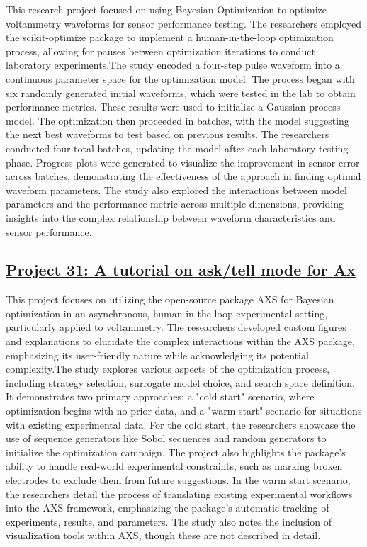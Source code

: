 This research project focused on using Bayesian Optimization to optimize voltammetry waveforms for sensor performance testing. The researchers employed the scikit-optimize package to implement a human-in-the-loop optimization process, allowing for pauses between optimization iterations to conduct laboratory experiments.The study encoded a four-step pulse waveform into a continuous parameter space for the optimization model. The process began with six randomly generated initial waveforms, which were tested in the lab to obtain performance metrics. These results were used to initialize a Gaussian process model. The optimization then proceeded in batches, with the model suggesting the next best waveforms to test based on previous results. The researchers conducted four total batches, updating the model after each laboratory testing phase. Progress plots were generated to visualize the improvement in sensor error across batches, demonstrating the effectiveness of the approach in finding optimal waveform parameters. The study also explored the interactions between model parameters and the performance metric across multiple dimensions, providing insights into the complex relationship between waveform characteristics and sensor performance.
 \subsection*{\href{https://www.youtube.com/watch?v=X5PDvdXoBdA}{Project 31: A tutorial on ask/tell mode for Ax}}

This project focuses on utilizing the open-source package AXS for Bayesian optimization in an asynchronous, human-in-the-loop experimental setting, particularly applied to voltammetry. The researchers developed custom figures and explanations to elucidate the complex interactions within the AXS package, emphasizing its user-friendly nature while acknowledging its potential complexity.The study explores various aspects of the optimization process, including strategy selection, surrogate model choice, and search space definition. It demonstrates two primary approaches: a "cold start" scenario, where optimization begins with no prior data, and a "warm start" scenario for situations with existing experimental data. For the cold start, the researchers showcase the use of sequence generators like Sobol sequences and random generators to initialize the optimization campaign. The project also highlights the package's ability to handle real-world experimental constraints, such as marking broken electrodes to exclude them from future suggestions. In the warm start scenario, the researchers detail the process of translating existing experimental workflows into the AXS framework, emphasizing the package's automatic tracking of experiments, results, and parameters. The study also notes the inclusion of visualization tools within AXS, though these are not described in detail.
